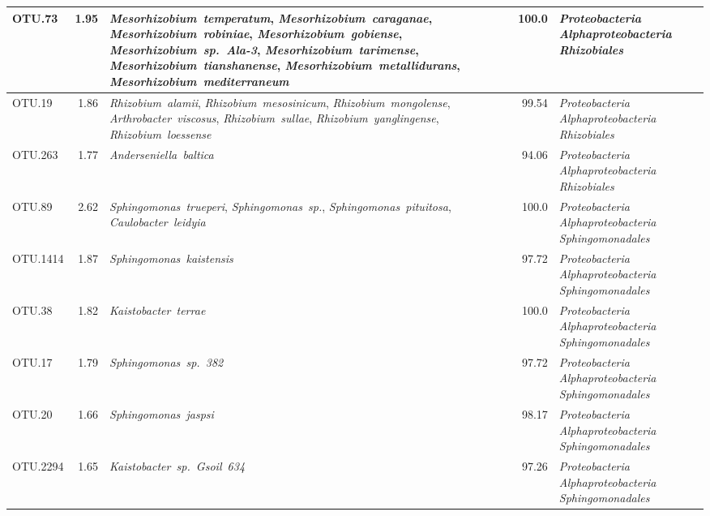 \documentclass[10pt]{article}
\begin{document}
\begin{longtable}{lrP{5cm}rP{7cm}}
OTU.73 & 1.95 & \mbox{\textit{Mesorhizobium temperatum}}, \mbox{\textit{Mesorhizobium caraganae}}, \mbox{\textit{Mesorhizobium robiniae}}, \mbox{\textit{Mesorhizobium gobiense}}, \mbox{\textit{Mesorhizobium sp. Ala-3}}, \mbox{\textit{Mesorhizobium tarimense}}, \mbox{\textit{Mesorhizobium tianshanense}}, \mbox{\textit{Mesorhizobium metallidurans}}, \mbox{\textit{Mesorhizobium mediterraneum}} & 100.0 & \mbox{\textit{Proteobacteria}} \mbox{\textit{Alphaproteobacteria}} \mbox{\textit{Rhizobiales}} \\ \midrule
OTU.19 & 1.86 & \mbox{\textit{Rhizobium alamii}}, \mbox{\textit{Rhizobium mesosinicum}}, \mbox{\textit{Rhizobium mongolense}}, \mbox{\textit{Arthrobacter viscosus}}, \mbox{\textit{Rhizobium sullae}}, \mbox{\textit{Rhizobium yanglingense}}, \mbox{\textit{Rhizobium loessense}} & 99.54 & \mbox{\textit{Proteobacteria}} \mbox{\textit{Alphaproteobacteria}} \mbox{\textit{Rhizobiales}} \\ \midrule
OTU.263 & 1.77 & \mbox{\textit{Anderseniella baltica}} & 94.06 & \mbox{\textit{Proteobacteria}} \mbox{\textit{Alphaproteobacteria}} \mbox{\textit{Rhizobiales}} \\ \midrule
OTU.89 & 2.62 & \mbox{\textit{Sphingomonas trueperi}}, \mbox{\textit{Sphingomonas sp.}}, \mbox{\textit{Sphingomonas pituitosa}}, \mbox{\textit{Caulobacter leidyia}} & 100.0 & \mbox{\textit{Proteobacteria}} \mbox{\textit{Alphaproteobacteria}} \mbox{\textit{Sphingomonadales}} \\ \midrule
OTU.1414 & 1.87 & \mbox{\textit{Sphingomonas kaistensis}} & 97.72 & \mbox{\textit{Proteobacteria}} \mbox{\textit{Alphaproteobacteria}} \mbox{\textit{Sphingomonadales}} \\ \midrule
OTU.38 & 1.82 & \mbox{\textit{Kaistobacter terrae}} & 100.0 & \mbox{\textit{Proteobacteria}} \mbox{\textit{Alphaproteobacteria}} \mbox{\textit{Sphingomonadales}} \\ \midrule
OTU.17 & 1.79 & \mbox{\textit{Sphingomonas sp. 382}} & 97.72 & \mbox{\textit{Proteobacteria}} \mbox{\textit{Alphaproteobacteria}} \mbox{\textit{Sphingomonadales}} \\ \midrule
OTU.20 & 1.66 & \mbox{\textit{Sphingomonas jaspsi}} & 98.17 & \mbox{\textit{Proteobacteria}} \mbox{\textit{Alphaproteobacteria}} \mbox{\textit{Sphingomonadales}} \\ \midrule
OTU.2294 & 1.65 & \mbox{\textit{Kaistobacter sp. Gsoil 634}} & 97.26 & \mbox{\textit{Proteobacteria}} \mbox{\textit{Alphaproteobacteria}} \mbox{\textit{Sphingomonadales}} \\ \midrule

\end{longtable}
\end{document}
